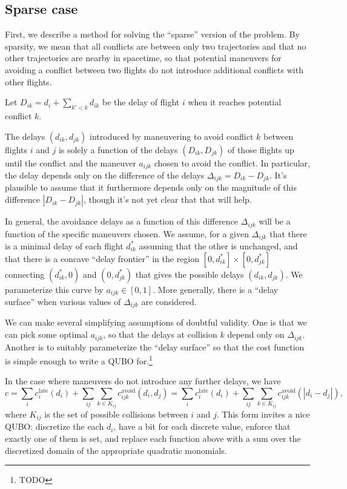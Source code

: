 \documentclass{article}
\begin{document}
\subsection{Sparse case}

First, we describe a method for solving the ``sparse'' version of the problem. 
By sparsity, we mean that all conflicts are between only two trajectories and that no other trajectories are nearby in spacetime, so that potential maneuvers for avoiding a conflict between two flights do not introduce additional conflicts with other flights.

Let $D_{ik} = d_i + \sum_{k' < k} d_{ik}$ be the delay of flight $i$ when it reaches potential conflict $k$.

The delays $(d_{ik}, d_{jk})$ introduced by maneuvering to avoid conflict $k$ between flights $i$ and $j$ is solely a function of the delays $(D_{ik}, D_{jk})$ of those flights up until the conflict and the maneuver $a_{ijk}$ chosen to avoid the conflict.
In particular, the delay depends only on the difference of the delays $\Delta_{ijk} = D_{ik} - D_{jk}$.
It's plausible to assume that it furthermore depends only on the magnitude of this difference $|D_{ik} - D_{jk}|$, though it's not yet clear that that will help.

In general, the avoidance delays as a function of this difference $\Delta_{ijk}$ will be a function of the specific maneuvers chosen. 
We assume, for a given $\Delta_{ijk}$ that there is a minimal delay of each flight $d_{ik}^*$ assuming that the other is unchanged, and that there is a concave ``delay frontier'' in the region $[0, d_{ik}^*] \times [0, d_{jk}^*]$ connecting $(d_{ik}^*, 0)$ and $(0, d_{jk}^*)$ that gives the possible delays $(d_{ik}, d_{jk})$. 
We parameterize this curve by $a_{ijk} \in [0, 1]$.
More generally, there is a ``delay surface'' when various values of $\Delta_{ijk}$ are considered.

We can make several simplifying assumptions of doubtful validity.
One is that we can pick some optimal $a_{ijk}$, so that the delays at collision $k$ depend only on $\Delta_{ijk}$.
Another is to suitably parameterize the ``delay surface'' so that the cost function is simple enough to write a QUBO for.\footnote{TODO}

In the case where maneuvers do not introduce any further delays, we have
\begin{equation*}
c = 
\sum_i c^{\mathrm{late}}_i (d_i) + 
\sum_{ij} \sum_{k \in K_{ij}} c^{\mathrm{avoid}}_{ijk} (d_i, d_j)
=
\sum_i c^{\mathrm{late}}_i (d_i) + 
\sum_{ij} \sum_{k \in K_{ij}} c^{\mathrm{avoid}}_{ijk} (|d_i - d_j|),
\end{equation*}
where $K_{ij}$ is the set of possible collisions between $i$ and $j$.
This form invites a nice QUBO: discretize the each $d_i$, have a bit for each discrete value, enforce that exactly one of them is set, and replace each function above with a sum over the discretized domain of the appropriate quadratic monomials.
\end{document}
